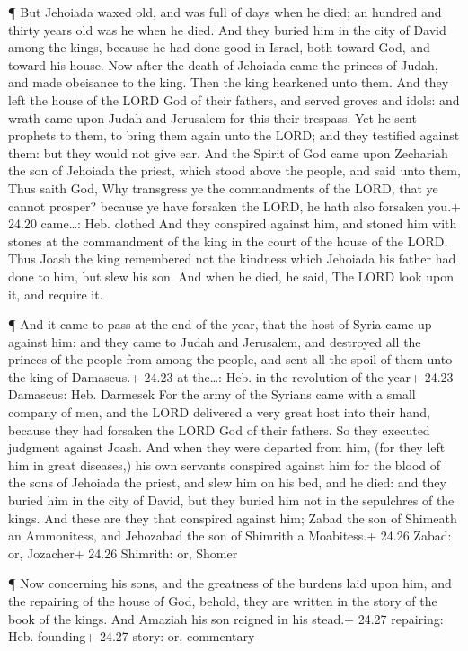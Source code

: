  ¶ But Jehoiada waxed old, and was full of days when he
died; an hundred and thirty years old was he when he died. 
And they buried him in the city of David among the kings, because he had
done good in Israel, both toward God, and toward his house.
 Now after the death of Jehoiada came the princes of Judah,
and made obeisance to the king. Then the king hearkened unto them.
 And they left the house of the LORD God of their fathers,
and served groves and idols: and wrath came upon Judah and Jerusalem for
this their trespass.  Yet he sent prophets to them, to
bring them again unto the LORD; and they testified against them: but
they would not give ear.  And the Spirit of God came upon
Zechariah the son of Jehoiada the priest, which stood above the people,
and said unto them, Thus saith God, Why transgress ye the commandments
of the LORD, that ye cannot prosper? because ye have forsaken the LORD,
he hath also forsaken you.+ 24.20 came\ldots: Heb. clothed 
And they conspired against him, and stoned him with stones at the
commandment of the king in the court of the house of the LORD.
 Thus Joash the king remembered not the kindness which
Jehoiada his father had done to him, but slew his son. And when he died,
he said, The LORD look upon it, and require it.

 ¶ And it came to pass at the end of the year, that the
host of Syria came up against him: and they came to Judah and Jerusalem,
and destroyed all the princes of the people from among the people, and
sent all the spoil of them unto the king of Damascus.+ 24.23 at
the\ldots: Heb. in the revolution of the year+ 24.23 Damascus: Heb.
Darmesek  For the army of the Syrians came with a small
company of men, and the LORD delivered a very great host into their
hand, because they had forsaken the LORD God of their fathers. So they
executed judgment against Joash.  And when they were
departed from him, (for they left him in great diseases,) his own
servants conspired against him for the blood of the sons of Jehoiada the
priest, and slew him on his bed, and he died: and they buried him in the
city of David, but they buried him not in the sepulchres of the kings.
 And these are they that conspired against him; Zabad the
son of Shimeath an Ammonitess, and Jehozabad the son of Shimrith a
Moabitess.+ 24.26 Zabad: or, Jozacher+ 24.26 Shimrith: or, Shomer

 ¶ Now concerning his sons, and the greatness of the
burdens laid upon him, and the repairing of the house of God, behold,
they are written in the story of the book of the kings. And Amaziah his
son reigned in his stead.+ 24.27 repairing: Heb. founding+ 24.27 story:
or, commentary

